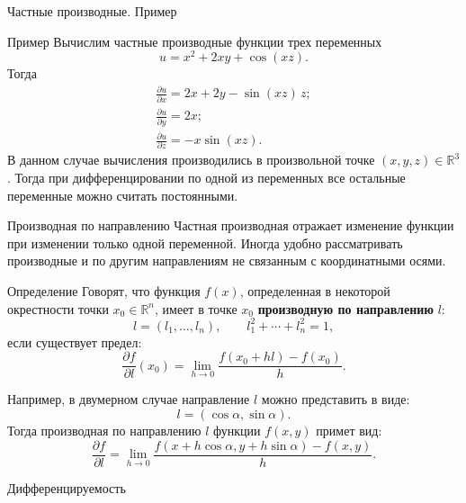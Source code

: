 \documentclass[8pt]{beamer}
\begin{document}
\begin{frame}{Частные производные. Пример}
\begin{block}{Пример}
Вычислим частные производные функции трех переменных
$$u = x^2+2xy+\cos(x z).$$
Тогда
$$\begin{array}{l}
\frac{\partial u}{\partial x} = 2x+2y-\sin(xz)\, z;\\[0.8em]
\frac{\partial u}{\partial y} = 2x;\\[0.8em]
\frac{\partial u}{\partial z} = -x\sin(x z).
\end{array}$$
В данном случае вычисления производились в произвольной точке $(x,y,z)\in\mathbb{R}^3$. Тогда при дифференцировании по одной из переменных все остальные переменные можно считать постоянными.
\end{block}
\end{frame}

\begin{frame}{Производная по направлению}
Частная производная отражает изменение функции при изменении только одной переменной. Иногда удобно рассматривать производные и по другим направлениям не связанным с координатными осями.

\begin{block}{Определение}
Говорят, что функция $f(x)$, определенная в некоторой окрестности точки $x_0\in\mathbb{R}^n$, имеет в точке $x_0$ {\bf производную по направлению} $l$:
$$l = (l_1,\ldots, l_n),\qquad l_1^2+\cdots+l_n^2 = 1,$$
если существует предел:
$$\frac{\partial f}{\partial l}(x_0) = \lim_{h\to0}\frac{f(x_0+h l) - f(x_0)}{h}.$$
\end{block}
Например, в двумерном случае направление $l$ можно представить в виде:
$$l = (\cos\alpha, \sin\alpha).$$
Тогда производная по направлению $l$ функции $f(x,y)$ примет вид:
$$\frac{\partial f}{\partial l} = \lim_{h\to0}\frac{f(x+h\cos\alpha, y+h\sin\alpha) - f(x,y)}{h}.$$

\end{frame}

\begin{frame}{Дифференцируемость}
\end{frame}
\end{document}
